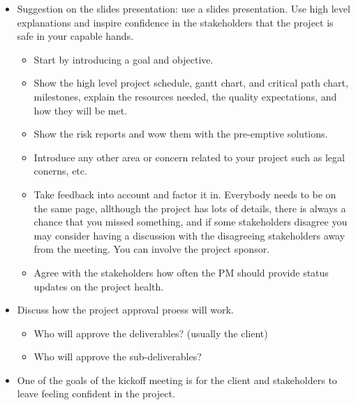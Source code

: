 \begin{itemize}
    \item Suggestion on the slides presentation: use a slides presentation. Use high level explanations and inspire confidence in the stakeholders that the project is safe in your capable hands.
        \begin{itemize}
            \item Start by introducing a goal and objective.
            \item Show the high level project schedule, gantt chart, and critical path chart, milestones, explain the resources needed, the quality expectations, and how they will be met.
            \item Show the risk reports and wow them with the pre-emptive solutions.
            \item Introduce any other area or concern related to your project such as legal conerns, etc.
            \item Take feedback into account and factor it in. Everybody needs to be on the same page, allthough the project has lots of details, there is always a chance that you missed something, and if some stakeholders disagree you may consider having a discussion with the disagreeing stakeholders away from the meeting. You can involve the project sponsor.
            \item Agree with the stakeholders how often the PM should provide status updates on the project health.
        \end{itemize}

    \item Discuss how the project approval proess will work.
        \begin{itemize}
            \item Who will approve the deliverables? (usually the client)
            \item Who will approve the sub-deliverables?
        \end{itemize}
    
    \item One of the goals of the kickoff meeting is for the client and stakeholders to leave feeling confident in the project.
\end{itemize}

